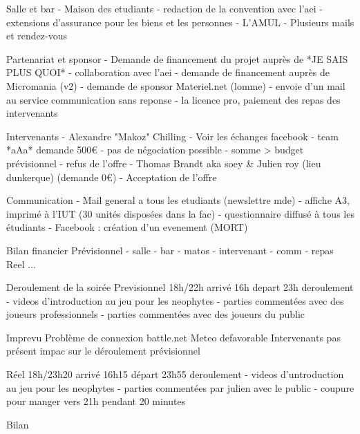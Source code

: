 	Salle et bar
	      - Maison des etudiants
	      	       - redaction de la convention avec l'aei
		       - extensions d'assurance pour les biens et les personnes
	      - L'AMUL
			- Plusieurs mails et rendez-vous

	Partenariat et sponsor
        - Demande de financement du projet auprès de *JE SAIS PLUS QUOI*
		    - collaboration avec l'aei
        - demande de financement auprès de Micromania (v2)
		    - demande de sponsor Materiel.net (lomme)
		    - envoie d'un mail au service communication sans reponse
		    - la licence pro, paiement des repas des intervenants

	Intervenants
    - Alexandre "Makoz" Chilling
      - Voir les échanges facebook
		- team *aAa* demande 500€
                    - pas de négociation possible
                    - somme > budget prévisionnel
                    - refus de l'offre
    - Thomas Brandt aka soey & Julien roy (lieu dunkerque) (demande 0€)
        - Acceptation de l'offre

        Communication
                - Mail general a tous les etudiants (newslettre mde)
                - affiche A3, imprimé à l'IUT (30 unités disposées dans la fac)
                - questionnaire diffusé à tous les étudiants
                - Facebook : création d'un evenement (MORT)

        Bilan financier
                Prévisionnel
                    - salle
                    - bar
                    - matos
                    - intervenant
                    - comm
                    - repas
                Reel
                   ...

        Deroulement de la soirée
                Previsionnel
                    18h/22h
                    arrivé 16h
                    depart 23h
                    deroulement
                        - videos d'introduction au jeu pour les neophytes
                        - parties commentées avec des joueurs professionnels
                        - parties commentées avec des joueurs du public

                Imprevu
                   Problème de connexion battle.net
                   Meteo defavorable
                   Intervenants pas présent
                   impac sur le déroulement prévisionnel

                Réel
                    18h/23h20
                    arrivé 16h15
                    départ 23h55
                    deroulement
                        - videos d'untroduction au jeu pour les neophytes
                        - parties commentées par julien avec le public
                        - coupure pour manger vers 21h pendant 20 minutes

Bilan
